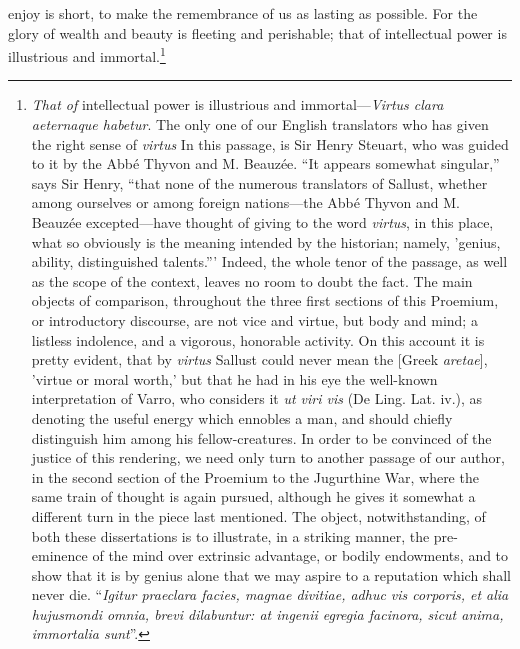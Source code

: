 enjoy is short, to make the remembrance of us as lasting as possible.
For the glory of wealth and beauty is fleeting and perishable; that of
intellectual power is illustrious and immortal.\footnote{\emph{That of} intellectual power is illustrious and immortal—\emph{Virtus
clara aeternaque habetur}. The only one of our English translators who
has given the right sense of \emph{virtus} In this passage, is Sir Henry
Steuart, who was guided to it by the Abbé Thyvon and M. Beauzée.
``It appears somewhat singular,'' says Sir Henry, ``that none of the
numerous translators of Sallust, whether among ourselves or among
foreign nations—the Abbé Thyvon and M. Beauzée excepted—have thought
of giving to the word \emph{virtus}, in this place, what so obviously is the
meaning intended by the historian; namely, 'genius, ability,
distinguished talents.''' Indeed, the whole tenor of the passage, as well
as the scope of the context, leaves no room to doubt the fact. The main
objects of comparison, throughout the three first sections of this
Proemium, or introductory discourse, are not vice and virtue, but body
and mind; a listless indolence, and a vigorous, honorable activity.
On this account it is pretty evident, that by \emph{virtus} Sallust could
never mean the [Greek \emph{aretae}], 'virtue or moral worth,' but that he
had in his eye the well-known interpretation of Varro, who considers it
\emph{ut viri vis} (De Ling. Lat. iv.), as denoting the useful energy which
ennobles a man, and should chiefly distinguish him among his
fellow-creatures. In order to be convinced of the justice of this
rendering, we need only turn to another passage of our author, in the
second section of the Proemium to the Jugurthine War, where the same
train of thought is again pursued, although he gives it somewhat a
different turn in the piece last mentioned. The object, notwithstanding,
of both these dissertations is to illustrate, in a striking manner, the
pre-eminence of the mind over extrinsic advantage, or bodily endowments,
and to show that it is by genius alone that we may aspire to a reputation
which shall never die. ``\emph{Igitur praeclara facies, magnae divitiae,
adhuc vis corporis, et alia hujusmondi omnia, brevi dilabuntur: at
ingenii egregia facinora, sicut anima, immortalia sunt}''.}

